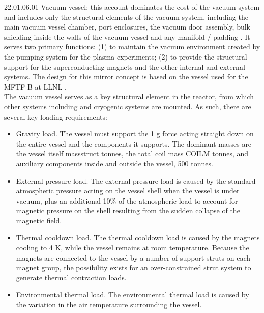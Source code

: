 22.01.06.01 Vacuum vessel: this account dominates the cost of the vacuum system and includes only the structural elements of the vacuum system, including the main vacuum vessel chamber, port enclosures, the vacuum door assembly, bulk shielding inside the walls of the vacuum vessel and any manifold / padding \cite{waganer2006design}. It serves two primary functions: (1) to maintain the vacuum environment created by the pumping system for the plasma experiments; (2) to provide the structural support for the superconducting magnets and the other internal and external systems. The design for this mirror concept is based on the vessel used for the MFTF-B at LLNL \cite{gerich1986design}. \\

The vacuum vessel serves as a  key structural element in the reactor, from which other systems including and cryogenic systems are mounted.  As such, there are several key loading requirements:

\begin{itemize}
    \item Gravity load. The vessel must support the 1 g force acting straight down on the entire vessel and the components it supports. The dominant masses are the vessel itself massstruct tonnes, the total coil mass COILM tonnes, and auxiliary components inside and outside the vessel, 500 tonnes.

    \item External pressure load. The external pressure load is caused by the standard atmospheric pressure acting on the vessel shell when the vessel is under vacuum, plus an additional 10\% of the atmospheric load to account for magnetic  pressure on the shell resulting from the sudden collapse of the magnetic field. 

    \item Thermal cooldown load. The thermal cooldown load is  caused by the magnets cooling to 4 K, while the vessel remains at room temperature. Because the magnets are connected to the vessel by a number of support struts on each  magnet group, the possibility exists for an over-constrained  strut system to generate thermal contraction loads.

    \item Environmental thermal load. The environmental thermal load is caused by the variation in the air temperature surrounding the vessel.

\end{itemize}


